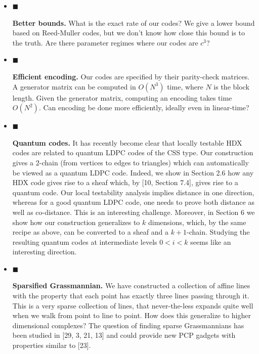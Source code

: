 \documentclass[10pt,a4paper]{article}
\begin{document}
\begin{itemize}


\item[] 
$\blacksquare$ 


\textbf{Better bounds.} What is the exact rate of our codes? We give a lower bound based on Reed-Muller codes, but we don’t know how close this bound is to the truth. Are there parameter regimes where our codes are $c^{3}$?\par





\item[] 
$\blacksquare$ 


\textbf{Efficient encoding.} Our codes are specified by their parity-check matrices. A generator matrix can be computed in $O(N^{3})$ time, where $N$ is the block length. Given the generator matrix, computing an encoding takes time $O(N^{2})$. Can encoding be done more efficiently, ideally even in linear-time?\par





\item[] 
$\blacksquare$ 


\textbf{Quantum codes.} It has recently become clear that locally testable HDX codes are related to quantum LDPC codes of the CSS type. Our construction gives a $2$-chain (from vertices to edges to triangles) which can automatically be viewed as a quantum LDPC code. Indeed, we show in Section 2.6 how any HDX code gives rise to a sheaf which, by [10, Section 7.4], gives rise to a quantum code. Our local testability analysis implies distance in one direction, whereas for a good quantum LDPC code, one needs to prove both distance as well as co-distance. This is an interesting challenge. Moreover, in Section 6 we show how our construction generalizes to $k$ dimensions, which, by the same recipe as above, can be converted to a sheaf and a $k+1$-chain. Studying the resulting quantum codes at intermediate levels $0<i<k$ seems like an interesting direction.\par





\item[] 
$\blacksquare$ 


\textbf{Sparsified Grassmannian.} We have constructed a collection of affine lines with the property that each point has exactly three lines passing through it. This is a very sparse collection of lines, that never-the-less expands quite well when we walk from point to line to point. How does this generalize to higher dimensional complexes? The question of finding sparse Grassmannians has been studied in [29, 3, 21, 13] and could provide new PCP gadgets with properties similar to [23].\par






\end{itemize}
\end{document}
